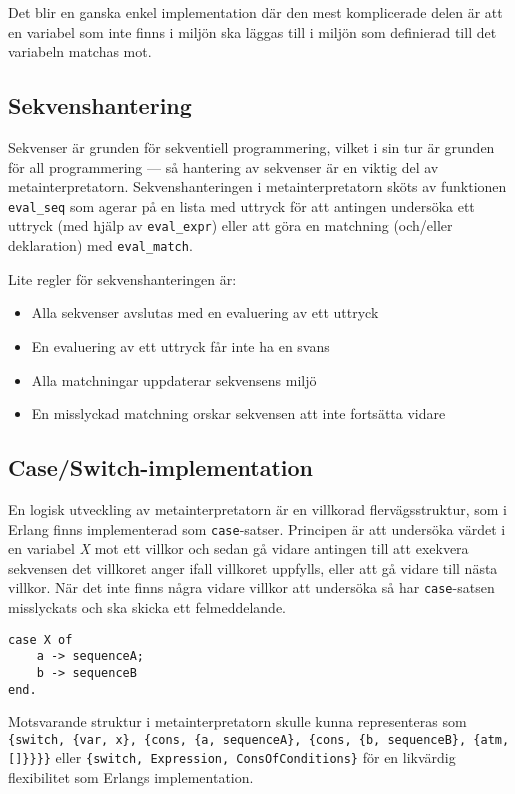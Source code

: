 \documentclass[a4paper, 11pt]{article}
\begin{document}
Det blir en ganska enkel implementation där den mest komplicerade delen är att en variabel som inte finns i miljön ska läggas till i miljön som definierad till det variabeln matchas mot.

\subsection{Sekvenshantering}
Sekvenser är grunden för sekventiell programmering, vilket i sin tur är grunden för all programmering --- så hantering av sekvenser är en viktig del av metainterpretatorn. Sekvenshanteringen i metainterpretatorn sköts av funktionen \texttt{eval_seq} som agerar på en lista med uttryck för att antingen undersöka ett uttryck (med hjälp av \texttt{eval_expr}) eller att göra en matchning (och/eller deklaration) med \texttt{eval_match}.

Lite regler för sekvenshanteringen är:

\begin{itemize}
\item Alla sekvenser avslutas med en evaluering av ett uttryck
\item En evaluering av ett uttryck får inte ha en svans
\item Alla matchningar uppdaterar sekvensens miljö
\item En misslyckad matchning orskar sekvensen att inte fortsätta vidare
\end{itemize}

\subsection{Case/Switch-implementation}
\label{subsec:caseswitch}
En logisk utveckling av metainterpretatorn är en villkorad flervägsstruktur, som i Erlang finns implementerad som \texttt{case}-satser. Principen är att under\-söka värdet i en variabel \textit{X} mot ett villkor och sedan gå vidare antingen till att exekvera sekvensen det villkoret anger ifall villkoret uppfylls, eller att gå vidare till nästa villkor. När det inte finns några vidare villkor att undersöka så har \texttt{case}-satsen misslyckats och ska skicka ett fel\-meddel\-ande.

\begin{lstlisting}
case X of
    a -> sequenceA;
    b -> sequenceB
end.
\end{lstlisting}

Motsvarande struktur i metainterpretatorn skulle kunna representeras som \\ \lstinline${switch, {var, x}, {cons, {a, sequenceA}, {cons, {b, sequenceB}, {atm, []}}}}$ eller \lstinline${switch, Expression, ConsOfConditions}$ för en likvärdig flexibilitet som Erlangs implementation.
\end{document}
